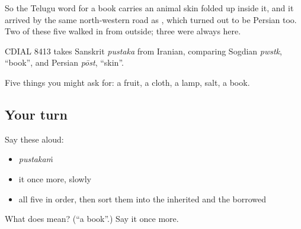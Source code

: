 So the Telugu word for a book carries an animal skin folded up inside it, and it arrived by the same north-western road as , which turned out to be Persian too. Two of these five walked in from outside; three were always here.

CDIAL 8413 takes Sanskrit \emph{pustaka} from Iranian, comparing Sogdian \emph{pwstk}, \textquotedblleft{}book\textquotedblright{}, and Persian \emph{pōst}, \textquotedblleft{}skin\textquotedblright{}.

\begin{grammarlens}[title={What you've built}]
Five things you might ask for: a fruit, a cloth, a lamp, salt, a book.
\end{grammarlens}

\subsection*{Your turn}
Say these aloud:

\begin{itemize}
\raggedright
  \item \emph{pustakaṁ}
  \item it once more, slowly
  \item all five in order, then sort them into the inherited and the borrowed
\end{itemize}

\begin{tcolorbox}[breakable,colback=teal!4,colframe=teal!35!black,title={Before you move on}]
What does  mean? (\textquotedblleft{}a book\textquotedblright{}.) Say it once more.
\end{tcolorbox}
